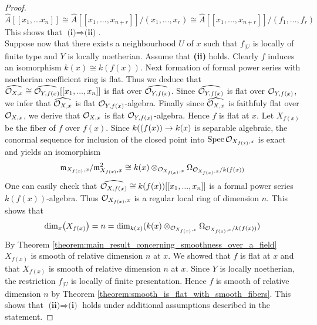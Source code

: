\begin{proof}
$$\widehat{A}[[x_{1},...x_{n}]]\cong \widehat{A}[[x_1,...,x_{n+r}]]/(x_1,...,x_r)\cong \widehat{A}[[x_1,...,x_{n+r}]]/(f_1,...,f_r)$$
This shows that $\textbf{(i)}\Rightarrow \textbf{(ii)}$.\\
Suppose now that there exists a neighbourhood $U$ of $x$ such that $f_{\mid U}$ is locally of finite type and $Y$ is locally noetherian. Assume that \textbf{(ii)} holds. Clearly $f$ induces an isomorphism $k(x)\cong k(f(x))$. Next formation of formal power series with noetherian coefficient ring is flat. Thus we deduce that $\widehat{{\mathcal O}_{X,x}}\cong \widehat{{\mathcal O}_{Y,f(x)}}[[x_1,...,x_n]]$ is flat over $\widehat{{\mathcal O}_{Y,f(x)}}$. Since $\widehat{{\mathcal O}_{Y,f(x)}}$ is flat over ${\mathcal O}_{Y,f(x)}$, we infer that $\widehat{{\mathcal O}_{X,x}}$ is flat ${\mathcal O}_{Y,f(x)}$-algebra. Finally since $\widehat{{\mathcal O}_{X,x}}$ is faithfuly flat over ${\mathcal O}_{X,x}$, we derive that ${\mathcal O}_{X,x}$ is flat ${\mathcal O}_{Y,f(x)}$-algebra. Hence $f$ is flat at $x$. Let $X_{f(x)}$ be the fiber of $f$ over $f(x)$. Since $k((f(x))\rightarrow k(x)$ is separable algebraic, the conormal sequence for inclusion of the closed point into $\mathrm{Spec}\, {\mathcal O}_{X_{f(x)},x}$ is exact and yields an isomorphism
$$\mathfrak{m}_{X_{f(x)},x}/\mathfrak{m}_{X_{f(x)},x}^2\cong k(x)\otimes_{{\mathcal O}_{X_{f(x)},x}}\Omega_{{\mathcal O}_{X_{f(x)},x}/k(f(x))}$$
One can easily check that $\widehat{{\mathcal O}_{X,f(x)}}\cong k(f(x))[[x_1,...,x_n]]$ is a formal power series $k(f(x))$-algebra. Thus ${\mathcal O}_{X_{f(x)},x}$ is a regular local ring of dimension $n$. This shows that
$$\mathrm{dim}_x\big(X_{f(x)}\big)=n=\mathrm{dim}_{k(x)}(k(x)\otimes_{{\mathcal O}_{X_{f(x)},x}}\Omega_{{\mathcal O}_{X_{f(x)},x}/k(f(x))})$$
By Theorem \ref{theorem:main_result_concerning_smoothness_over_a_field} $X_{f(x)}$ is smooth of relative dimension $n$ at $x$. We showed that $f$ is flat at $x$ and that $X_{f(x)}$ is smooth of relative dimension $n$ at $x$. Since $Y$ is locally noetherian, the restriction $f_{\mid U}$ is locally of finite presentation. Hence $f$ is smooth of relative dimension $n$ by Theorem \ref{theorem:smooth_is_flat_with_smooth_fibers}. This shows that $\textbf{(ii)}\Rightarrow \textbf{(i)}$ holds under additional assumptions described in the statement.
\end{proof}


\small



